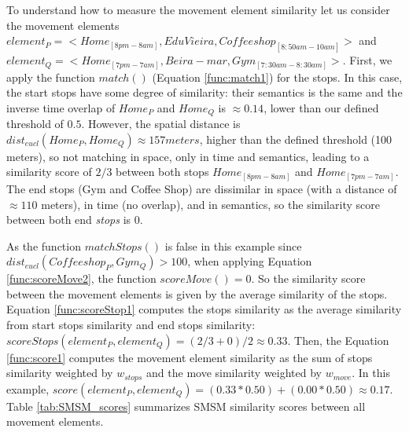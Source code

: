 \documentclass[12pt]{article}
\begin{document}
To understand how to measure the movement element similarity let us consider the movement elements $element_{P}=<Home_{[8pm-8am]},Edu Vieira,Coffee shop_{[8:50am-10am]}>$ and $element_{Q}=<Home_{[7pm-7am]},Beira-mar,Gym_{[7:30am-8:30am]}>$. First, we apply the function $match()$ (Equation \ref{func:match1}) for the stops. In this case, the start stops have some degree of similarity: their semantics is the same and the inverse time overlap of $Home_{P}$ and $Home_{Q}$ is $\approx 0.14$, lower than our defined threshold of $0.5$. However, the spatial distance is $dist_{eucl}(Home_{P}, Home_{Q}) \approx 157 meters $, higher than the defined threshold (100 meters), so not matching in space, only in time and semantics, leading to a similarity score of $2/3$ between both stops $Home_{[8pm-8am]}$ and $Home_{[7pm-7am]}$. The end stops (Gym and Coffee Shop) are dissimilar in space (with a distance of $\approx 110$ meters), in time (no overlap), and in semantics, so the similarity score between both end \textit{stops} is $0$.

As the function $matchStops()$ is false in this example since $dist_{eucl}(Coffee shop_{P}, Gym_{Q}) > 100$, when applying Equation \ref{func:scoreMove2}, the function $scoreMove()=0$. So the similarity score between the movement elements is given by the average similarity of the stops. Equation \ref{func:scoreStop1} computes the stops similarity as the average similarity from start stops similarity and end stops similarity: $scoreStops(element_{P}, element_{Q}) = (2/3 + 0) / 2 \approx 0.33$. Then, the Equation \ref{func:score1} computes the movement element similarity as the sum of stops similarity weighted by $w_{stops}$ and the move similarity weighted by $w_{move}$. In this example, $score(element_{P}, element_{Q}) = (0.33 * 0.50) + (0.00 * 0.50) \approx 0.17$. Table \ref{tab:SMSM_scores} summarizes SMSM similarity scores between all movement elements.
\end{document}

